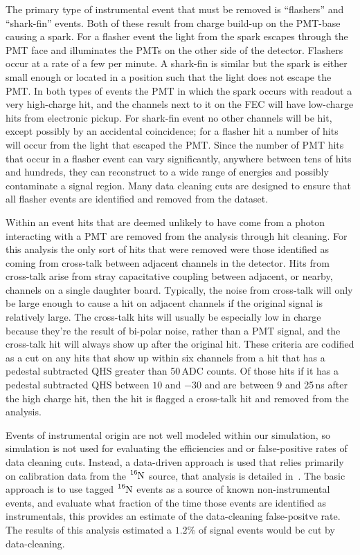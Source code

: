 The primary type of instrumental event that must be removed is ``flashers'' and
``shark-fin'' events.
Both of these result from charge build-up on the PMT-base causing a
spark.
For a flasher event the light from the spark escapes through the PMT face
and illuminates the PMTs on the other side of the detector.
Flashers occur at a rate of a few per minute.
A shark-fin is similar but the spark is either small enough or located
in a position such that the light does not escape the PMT.\@
In both types of events the PMT in which the spark occurs with readout
a very high-charge hit, and the channels next to it on the FEC will
have low-charge hits from electronic pickup.
For shark-fin event no other channels will be hit, except possibly by an
accidental coincidence; for a flasher hit a number of hits will
occur from the light that escaped the PMT.\@
Since the number of PMT hits that occur in a flasher event can vary significantly,
anywhere between tens of hits and hundreds, they can reconstruct
to a wide range of energies and possibly contaminate a signal region.
Many data cleaning cuts are designed to ensure that all
flasher events are identified and removed from the dataset.

Within an event hits that are deemed unlikely to have come from a photon interacting with a PMT
are removed from the analysis through hit cleaning.
For this analysis the only sort of hits that were removed were those identified
as coming from cross-talk between adjacent channels in the detector.
Hits from cross-talk arise from stray capacitative coupling between adjacent, or nearby, channels
on a single daughter board.
Typically, the noise from cross-talk will only be large enough to cause a hit
on adjacent channels if the original signal is relatively large.
The cross-talk hits will usually be especially low in charge because they're
the result of bi-polar noise, rather than a PMT signal, and the cross-talk
hit will always show up after the original hit.
These criteria are codified as a cut on any hits that show up within
 six channels from a hit that has a pedestal subtracted QHS greater
than 50\,ADC counts. Of those hits if it has a pedestal subtracted QHS between
$10$ and $-30$ and are between 9 and 25\,ns after the high charge hit,
then the hit is flagged a cross-talk hit and removed from the analysis.

Events of instrumental origin are not well modeled within our simulation,
so simulation is not used for evaluating the efficiencies and or false-positive
rates of
data cleaning cuts.
Instead, a data-driven approach is used that relies primarily on calibration
data from the $\ce{^{16}N}$ source, that analysis is detailed in~\citep{dc_document}.%
The basic approach is to use tagged $\ce{^{16}N}$ events as a source of known
non-instrumental events, and evaluate what fraction of the time those events
are identified as instrumentals, this provides an estimate of the data-cleaning
false-positve rate.
The results of this analysis estimated a $1.2$\% of signal events
would be cut by data-cleaning.

